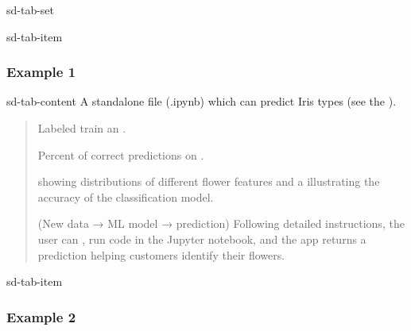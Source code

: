 \documentclass[letterpaper,10pt,english]{jupyterBook}
\begin{document}
\begin{sphinxuseclass}{sd-tab-set}
\begin{sphinxuseclass}{sd-tab-item}\subsubsection*{Example 1}

\begin{sphinxuseclass}{sd-tab-content}
\sphinxAtStartPar
{} A standalone  file (.ipynb) which can predict Iris types (see the ).
\begin{quote}

\sphinxAtStartPar
{} Labeled  train an {\hyperref[\detokenize{task2_c/example_sup_class/sup_class_ex-develop:sup-class-ex-develop}]{}}.

\sphinxAtStartPar
{} Percent of correct predictions on {\hyperref[\detokenize{task2_c/example_sup_class/sup_class_ex-accuracy:sup-class-ex-accuracy}]{}}.

\sphinxAtStartPar
{} {\hyperref[\detokenize{task2_c/example_sup_class/sup_class_ex-process:sup-class-ex-descriptive-methods-and-visualizations}]{}} showing distributions of different flower features and a {\hyperref[\detokenize{task2_c/example_sup_class/sup_class_ex-accuracy:sup-class-ex-accuracy-confusion-matrix}]{}} illustrating the accuracy of the classification model.

\sphinxAtStartPar
{} (New data → ML model → prediction) Following detailed instructions, the user can {\hyperref[\detokenize{task2_c/example_sup_class/sup_class_ex-ui:sup-class-ex-ui-code}]{}}, run code in the Jupyter notebook, and the app returns a prediction helping customers identify their flowers.
\end{quote}

\end{sphinxuseclass}
\end{sphinxuseclass}
\begin{sphinxuseclass}{sd-tab-item}\subsubsection*{Example 2}


\end{sphinxuseclass}
\end{sphinxuseclass}
\end{document}
